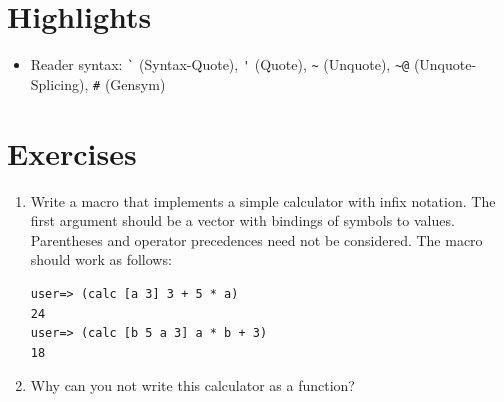 \documentclass[11pt,a4paper]{article}
\begin{document}
\section{Highlights}

\begin{itemize}
    \item Reader syntax: \verb|`| (Syntax-Quote), \verb|'| (Quote), \verb|~| (Unquote), \verb|~@| (Unquote-Splicing), \verb|#| (Gensym)
\end{itemize}



\section{Exercises}

\begin{exercise}[Macro]
\begin{enumerate}[label=\alph*)]
\item
Write a macro that implements a simple calculator with infix notation. The first argument should be a vector with bindings of symbols to values. Parentheses and operator precedences need not be considered. The macro should work as follows:
\begin{verbatim}
user=> (calc [a 3] 3 + 5 * a)
24
user=> (calc [b 5 a 3] a * b + 3)
18
\end{verbatim}
\item Why can you not write this calculator as a function?
\end{enumerate}
\end{exercise}
\end{document}
